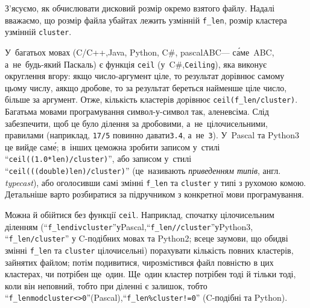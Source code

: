 \Tutorial
З'ясуємо, як обчислювати дисковий розмір окремо взятого файлу. Надалі вважаємо, що розмір файла у\nolinebreak[3] байтах лежить у\nolinebreak[3] змінній \texttt{f\_len}, розмір кластера у\nolinebreak[3] змінній \texttt{cluster}.

У~багатьох мовах (C/C++,\nolinebreak[2] Java, Python, C\#, pascalABC\nolinebreak[3] --- с\'{а}ме~ABC, а~не~будь-який Паскаль)
є функція \texttt{ceil} (у~C\#,\nolinebreak[2] \texttt{Ceiling}), яка виконує округлення вгору: якщо число-аргумент ціле, то результат дорівнює самому цьому числу, а\nolinebreak[3] якщо дробове, то за результат береться найменше ціле число, більше за аргумент. Отже, кількість кластерів дорівнює \texttt{ceil(f\_len/cluster)}. Багатьма мовами програмування символ-у-символ так, але\nolinebreak[2] не\nolinebreak[3] всіма. Слід забезпечити, щоб це було ділення за дробовими, а~не~цілочисельними, правилами (наприклад, \texttt{17/5} повинно давати\nolinebreak[3] \texttt{3.4}, а~не~\texttt{3}). У~Pascal та Python3 це вийде сам\'{е}; в~інших це\nolinebreak[3] можна зробити записом у~стилі ``\texttt{ceil((1.0*len)/cluster)}'', або записом у~стилі ``\texttt{ceil(((double)len)/cluster)}'' (це~називають \emph{приведенням типів}, англ. \emph{typecast}), або оголосивши самі змінні \texttt{f\_len} та \texttt{cluster} у типі з рухомою комою. Детальніше варто розбиратися за підручником з конкретної мови програмування.

Можна й обійтися без функції \texttt{ceil}. 
Наприклад, спочатку цілочисельним діленням (``\texttt{\mbox{f\_len}\nolinebreak[3] \mbox{div}\nolinebreak[2] cluster}''\nolinebreak[2] у\nolinebreak[3] Pascal,\linebreak[2] ``\texttt{\mbox{f\_len//}\nolinebreak[3]\mbox{cluster}}''\nolinebreak[3] у\nolinebreak[3] Python3, ``\texttt{\mbox{f\_len/}\nolinebreak[3]\mbox{cluster}}'' у \mbox{C-подіб}\-\nolinebreak[3]них мовах та Python2; все\nolinebreak[2] це за\nolinebreak[2] умови, що обидві змінні \texttt{f\_len} та \texttt{cluster} цілочисельні) порахувати кількість повних кластерів, зайнятих файлом; потім подивитися, чи\nolinebreak[3] розмістився файл повністю в цих кластерах, чи потрібен ще~один. Ще~один кластер потрібен тоді й тільки тоді, коли він неповний, тобто при діленні є залишок, тобто ``\texttt{\mbox{f\_len}\nolinebreak[3] \mbox{mod}\nolinebreak[2] cluster\nolinebreak[2]\hspace{0.125 em plus 0.125pt}\mbox{{<}{>}\hspace{0.125 em}0}}''\nolinebreak[2] (Pascal),\linebreak[2] ``\texttt{\mbox{f\_len\%}\nolinebreak[3]\mbox{cluster}\nolinebreak[3]\hspace{0.125 em plus 0.125pt}\mbox{!=\hspace{0.125 em}0}}'' (\mbox{C-подібні} та Python).

